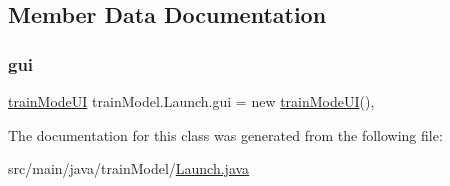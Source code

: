 \subsection{Member Data Documentation}
\mbox{\label{classtrainModel_1_1Launch_a54ad9d8c3da59d4e2aaca7bb7e73df6f}} 
\subsubsection{\texorpdfstring{gui}{gui}}
{\footnotesize\ttfamily \hyperlink{classtrainModel_1_1trainModeUI}{train\+Mode\+UI} train\+Model.\+Launch.\+gui = new \hyperlink{classtrainModel_1_1trainModeUI}{train\+Mode\+UI}()\hspace{0.3cm}{\ttfamily [static]}, {\ttfamily [package]}}



The documentation for this class was generated from the following file\+:\begin{DoxyCompactItemize}
\item 
src/main/java/train\+Model/\hyperlink{Launch_8java}{Launch.\+java}\end{DoxyCompactItemize}
